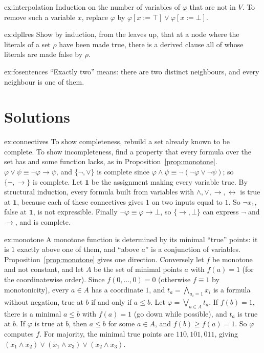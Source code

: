 \begin{hint}{ex:interpolation}
Induction on the number of variables of $\varphi$ that are not in $V$. To remove such a variable $x$, replace $\varphi$ by
$\varphi[x:=\top]\lor\varphi[x:=\bot]$.
\end{hint}
\begin{hint}{ex:dpllres}
Show by induction, from the leaves up, that at a node where the literals of a set $\rho$ have been made true, there is a
derived clause all of whose literals are made false by $\rho$.
\end{hint}
\begin{hint}{ex:fosentences}
``Exactly two'' means: there are two distinct neighbours, and every neighbour is one of them.
\end{hint}

\section{Solutions}

\begin{solution}{ex:connectives}
\idea To show completeness, rebuild a set already known to be complete. To show incompleteness, find a property that every
formula over the set has and some function lacks, as in Proposition~\ref{prop:monotone}.
\writeup $\varphi\lor\psi\equiv\neg\varphi\to\psi$, and $\{\neg,\lor\}$ is complete since $\varphi\land\psi\equiv\neg(\neg\varphi\lor\neg\psi)$; so $\{\neg,\to\}$ is complete. Let $\mathbf 1$ be the assignment
making every variable true. By structural induction, every formula built from variables with $\land,\lor,\to,\leftrightarrow$ is true at $\mathbf 1$,
because each of these connectives gives $1$ on two inputs equal to $1$. So $\neg x_1$, false at $\mathbf 1$, is not expressible. Finally
$\neg\varphi\equiv\varphi\to\bot$, so $\{\to,\bot\}$ can express $\neg$ and $\to$, and is complete.
\end{solution}

\begin{solution}{ex:monotone}
\idea A monotone function is determined by its minimal ``true'' points: it is $1$ exactly above one of them, and ``above $a$'' is
a conjunction of variables.
\writeup Proposition~\ref{prop:monotone} gives one direction. Conversely let $f$ be monotone and not constant, and let $A$ be the set of
minimal points $a$ with $f(a)=1$ (for the coordinatewise order). Since $f(0,\dots,0)=0$ (otherwise $f\equiv1$ by monotonicity), every
$a\in A$ has a coordinate $1$, and $t_a=\bigwedge_{a_i=1}x_i$ is a formula without negation, true at $b$ if and only if $a\le b$. Let
$\varphi=\bigvee_{a\in A}t_a$. If $f(b)=1$, there is a minimal $a\le b$ with $f(a)=1$ (go down while possible), and $t_a$ is true at $b$. If $\varphi$ is
true at $b$, then $a\le b$ for some $a\in A$, and $f(b)\ge f(a)=1$. So $\varphi$ computes $f$. For majority, the minimal true points are
$110,101,011$, giving $(x_1\land x_2)\lor(x_1\land x_3)\lor(x_2\land x_3)$.
\end{solution}

